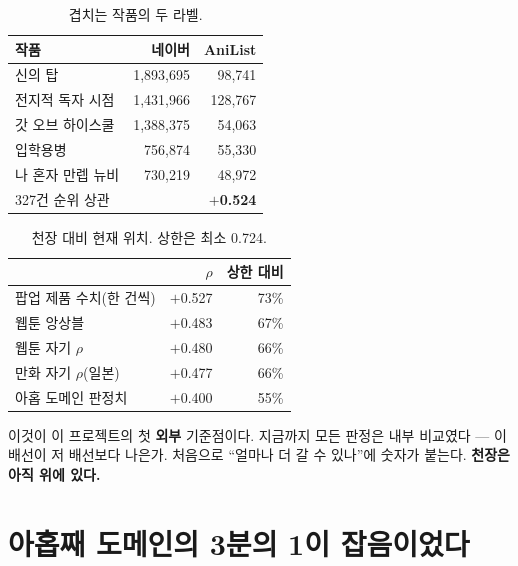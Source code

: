 \documentclass[10pt]{article}
\begin{document}
\begin{table}[t]
\centering\tsize
\caption{겹치는 작품의 두 라벨.}
\begin{tabular}{lrr}
\toprule
작품 & 네이버 & AniList \\
\midrule
신의 탑 & 1,893,695 & 98,741 \\
전지적 독자 시점 & 1,431,966 & 128,767 \\
갓 오브 하이스쿨 & 1,388,375 & 54,063 \\
입학용병 & 756,874 & 55,330 \\
나 혼자 만렙 뉴비 & 730,219 & 48,972 \\
\midrule
\multicolumn{2}{l}{327건 순위 상관} & \textbf{$+$0.524} \\
\bottomrule
\end{tabular}
\end{table}


\begin{table}[t]
\centering\tsize
\caption{천장 대비 현재 위치. 상한은 최소 0.724.}
\begin{tabular}{lrr}
\toprule
& $\rho$ & 상한 대비 \\
\midrule
팝업 제품 수치(한 건씩) & $+$0.527 & 73\% \\
웹툰 앙상블 & $+$0.483 & 67\% \\
웹툰 자기 $\rho$ & $+$0.480 & 66\% \\
만화 자기 $\rho$(일본) & $+$0.477 & 66\% \\
아홉 도메인 판정치 & $+$0.400 & 55\% \\
\bottomrule
\end{tabular}
\end{table}

이것이 이 프로젝트의 첫 \textbf{외부} 기준점이다. 지금까지 모든 판정은 내부
비교였다 --- 이 배선이 저 배선보다 나은가. 처음으로 ``얼마나 더 갈 수 있나''에
숫자가 붙는다. \textbf{천장은 아직 위에 있다.}

\section{아홉째 도메인의 3분의 1이 잡음이었다}
\end{document}
